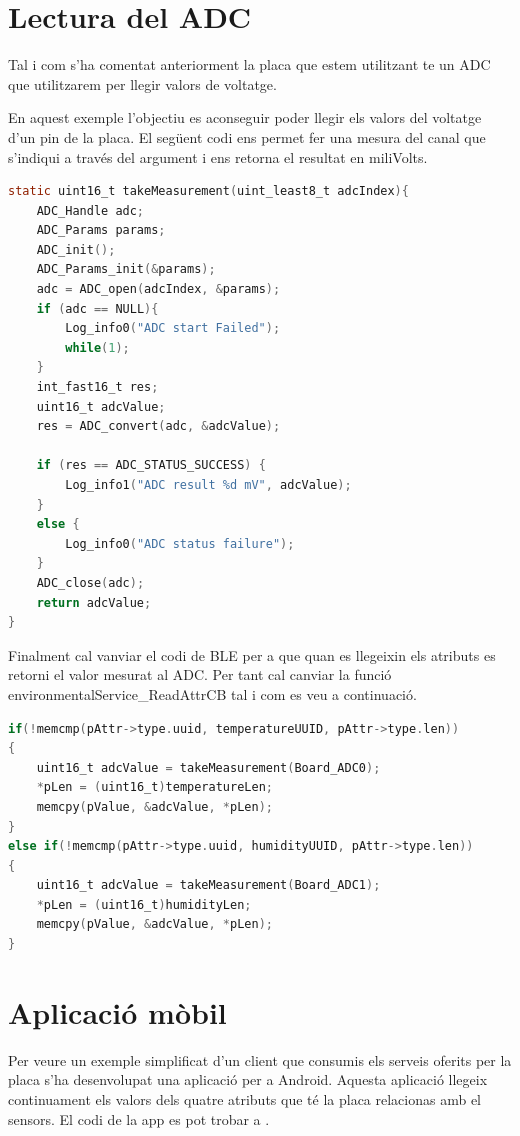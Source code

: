 \section{Lectura del ADC}
Tal i com s'ha comentat anteriorment la placa que estem utilitzant te un ADC que utilitzarem per llegir valors de voltatge.

En aquest exemple l'objectiu es aconseguir poder llegir els valors del voltatge d'un pin de la placa.
El següent codi ens permet fer una mesura del canal que s'indiqui a través del argument i ens retorna el resultat en miliVolts.

\begin{lstlisting}[language=C]
static uint16_t takeMeasurement(uint_least8_t adcIndex){
	ADC_Handle adc;
	ADC_Params params;
	ADC_init();
	ADC_Params_init(&params);
	adc = ADC_open(adcIndex, &params);
	if (adc == NULL){
		Log_info0("ADC start Failed");
		while(1);
	}
	int_fast16_t res;
	uint16_t adcValue;
	res = ADC_convert(adc, &adcValue);
	
	if (res == ADC_STATUS_SUCCESS) {
		Log_info1("ADC result %d mV", adcValue);
	}
	else {
		Log_info0("ADC status failure");
	}
	ADC_close(adc);
	return adcValue;
}
\end{lstlisting}

Finalment cal vanviar el codi de BLE per a que quan es llegeixin els atributs es retorni el valor mesurat al ADC.
Per tant cal canviar la funció environmentalService\_ReadAttrCB tal i com es veu a continuació.

\begin{lstlisting}[language=C]
  if(!memcmp(pAttr->type.uuid, temperatureUUID, pAttr->type.len))
{
	uint16_t adcValue = takeMeasurement(Board_ADC0);
	*pLen = (uint16_t)temperatureLen;
	memcpy(pValue, &adcValue, *pLen);
}
else if(!memcmp(pAttr->type.uuid, humidityUUID, pAttr->type.len))
{
	uint16_t adcValue = takeMeasurement(Board_ADC1);
	*pLen = (uint16_t)humidityLen;
	memcpy(pValue, &adcValue, *pLen);
}
\end{lstlisting}

\section{Aplicació mòbil}
Per veure un exemple simplificat d'un client que consumis els serveis oferits per la placa s'ha desenvolupat una aplicació per a Android.
Aquesta aplicació llegeix continuament els valors dels quatre atributs que té la placa relacionas amb el sensors.
El codi de la app es pot trobar a \cite{android_repo}.

